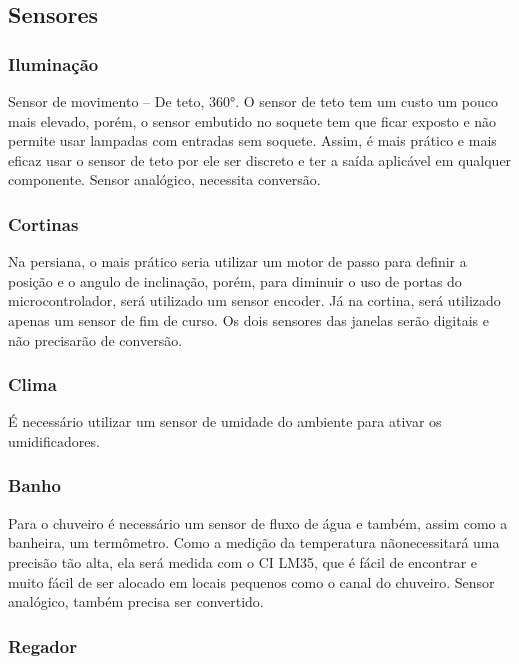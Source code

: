 \subsection{Sensores}

\subsubsection*{Iluminação}

	Sensor de movimento – De teto, 360°. O sensor de teto tem um custo um pouco mais elevado, porém, o sensor embutido no soquete tem que ficar exposto e não permite usar lampadas com entradas sem soquete. Assim, é mais prático e mais eficaz usar o sensor de teto por ele ser discreto e ter a saída aplicável em qualquer componente\cite{2014Thiago}. Sensor analógico, necessita conversão.

\subsubsection*{Cortinas}

	Na persiana, o mais prático seria utilizar um motor de passo para definir a posição e o angulo de inclinação, porém, para diminuir o uso de portas do microcontrolador, será utilizado um sensor encoder. Já na cortina, será utilizado apenas um sensor de fim de curso. Os dois sensores das janelas serão digitais e não precisarão de conversão.

\subsubsection*{Clima}

	É necessário utilizar um sensor de umidade do ambiente para ativar os umidificadores.

\subsubsection*{Banho}

	Para o chuveiro é necessário um sensor de fluxo de água e também, assim como a banheira, um termômetro. Como a medição da temperatura nãonecessitará uma precisão tão alta, ela será  medida com o CI LM35\cite{SNIS159E}, que é fácil de encontrar e muito fácil de ser alocado em locais pequenos como o canal do chuveiro. Sensor analógico, também precisa ser convertido.

\subsubsection*{Regador}

